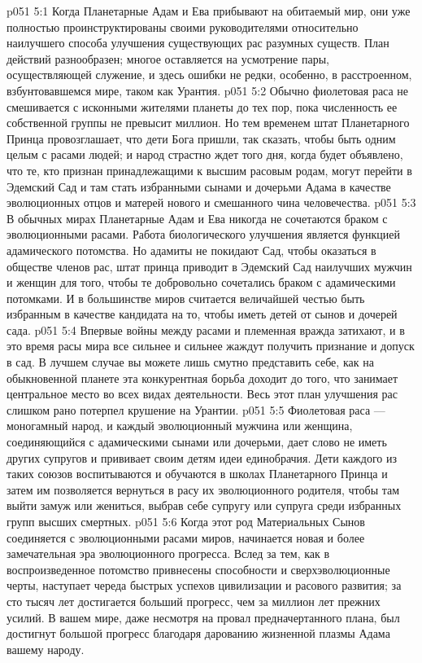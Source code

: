 \vs p051 5:1 Когда Планетарные Адам и Ева прибывают на обитаемый мир, они уже полностью проинструктированы своими руководителями относительно наилучшего способа улучшения существующих рас разумных существ. План действий разнообразен; многое оставляется на усмотрение пары, осуществляющей служение, и здесь ошибки не редки, особенно, в расстроенном, взбунтовавшемся мире, таком как Урантия.
\vs p051 5:2 Обычно фиолетовая раса не смешивается с исконными жителями планеты до тех пор, пока численность ее собственной группы не превысит миллион. Но тем временем штат Планетарного Принца провозглашает, что дети Бога пришли, так сказать, чтобы быть одним целым с расами людей; и народ страстно ждет того дня, когда будет объявлено, что те, кто признан принадлежащими к высшим расовым родам, могут перейти в Эдемский Сад и там стать избранными сынами и дочерьми Адама в качестве эволюционных отцов и матерей нового и смешанного чина человечества.
\vs p051 5:3 В обычных мирах Планетарные Адам и Ева никогда не сочетаются браком с эволюционными расами. Работа биологического улучшения является функцией адамического потомства. Но адамиты не покидают Сад, чтобы оказаться в обществе членов рас, штат принца приводит в Эдемский Сад наилучших мужчин и женщин для того, чтобы те добровольно сочетались браком с адамическими потомками. И в большинстве миров считается величайшей честью быть избранным в качестве кандидата на то, чтобы иметь детей от сынов и дочерей сада.
\vs p051 5:4 Впервые войны между расами и племенная вражда затихают, и в это время расы мира все сильнее и сильнее жаждут получить признание и допуск в сад. В лучшем случае вы можете лишь смутно представить себе, как на обыкновенной планете эта конкурентная борьба доходит до того, что занимает центральное место во всех видах деятельности. Весь этот план улучшения рас слишком рано потерпел крушение на Урантии.
\vs p051 5:5 \pc Фиолетовая раса --- моногамный народ, и каждый эволюционный мужчина или женщина, соединяющийся с адамическими сынами или дочерьми, дает слово не иметь других супругов и прививает своим детям идеи единобрачия. Дети каждого из таких союзов воспитываются и обучаются в школах Планетарного Принца и затем им позволяется вернуться в расу их эволюционного родителя, чтобы там выйти замуж или жениться, выбрав себе супругу или супруга среди избранных групп высших смертных.
\vs p051 5:6 Когда этот род Материальных Сынов соединяется с эволюционными расами миров, начинается новая и более замечательная эра эволюционного прогресса. Вслед за тем, как в воспроизведенное потомство привнесены способности и сверхэволюционные черты, наступает череда быстрых успехов цивилизации и расового развития; за сто тысяч лет достигается больший прогресс, чем за миллион лет прежних усилий. В вашем мире, даже несмотря на провал предначертанного плана, был достигнут большой прогресс благодаря дарованию жизненной плазмы Адама вашему народу.
